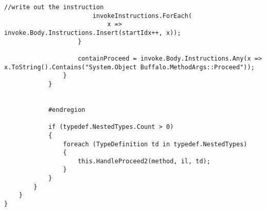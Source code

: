 \begin{lstlisting}[caption={../buffalo/Injectors/MethodAroundInjector.cs}, label=../buffalo/Injectors/MethodAroundInjector.cs, frame=tb, basicstyle=\scriptsize]
                        //write out the instruction
                        invokeInstructions.ForEach(
                            x => invoke.Body.Instructions.Insert(startIdx++, x));
                    }

                    containProceed = invoke.Body.Instructions.Any(x => x.ToString().Contains("System.Object Buffalo.MethodArgs::Proceed"));
                }
            }


            #endregion

            if (typedef.NestedTypes.Count > 0)
            {
                foreach (TypeDefinition td in typedef.NestedTypes)
                {
                    this.HandleProceed2(method, il, td);
                }
            }
        }
    }
}
\end{lstlisting}

